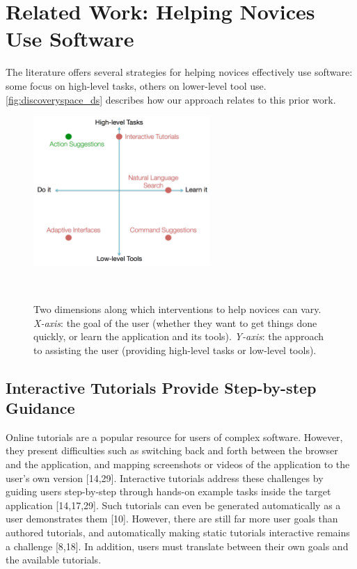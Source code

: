 \section{Related Work: Helping Novices Use Software}
The literature offers several strategies for helping novices effectively use software: some focus on high-level tasks, others on lower-level tool use. \autoref{fig:discoveryspace_ds} describes how our approach relates to this prior work. 

\begin{figure}
\centering
  \includegraphics[width=0.6\textwidth]{discoveryspace/figures/designspace.png}
  \caption{Two dimensions along which interventions to help novices can vary. \textit{X-axis}: the goal of the user (whether they want to get things done quickly, or learn the application and its tools). \textit{Y-axis}: the approach to assisting the user (providing high-level tasks or low-level tools).}~\label{fig:discoveryspace_ds}
\end{figure}

\subsection{Interactive Tutorials Provide Step-by-step Guidance}
Online tutorials are a popular resource for users of complex software. However, they present difficulties such as switching back and forth between the browser and the application, and mapping screenshots or videos of the application to the user's own version [14,29]. Interactive tutorials address these challenges by guiding users step-by-step through hands-on example tasks inside the target application [14,17,29]. Such tutorials can even be generated automatically as a user demonstrates them [10]. However, there are still far more user goals than authored tutorials, and automatically making static tutorials interactive remains a challenge [8,18]. In addition, users must translate between their own goals and the available tutorials.


